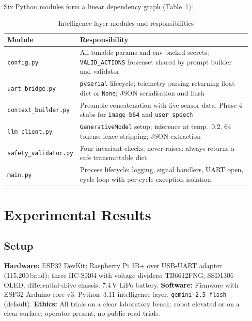 \documentclass[conference]{IEEEtran}
\begin{document}
Six Python modules form a linear dependency graph
(Table~\ref{tab:modules}):

\begin{table}[t]
\caption{Intelligence-layer modules and responsibilities}
\label{tab:modules}
\centering
\renewcommand{\arraystretch}{1.05}
\begin{tabular}{@{}p{2.1cm}p{5.2cm}@{}}
\toprule
\textbf{Module} & \textbf{Responsibility} \\
\midrule
\texttt{config.py}           & All tunable params and env-backed secrets;
  \texttt{VALID\_ACTIONS} frozenset shared by prompt builder and validator \\
\texttt{uart\_bridge.py}     & \texttt{pyserial} lifecycle; telemetry parsing
  returning float dict or \texttt{None}; JSON serialisation and flush \\
\texttt{context\_builder.py} & Preamble concatenation with live sensor data;
  Phase-4 stubs for \texttt{image\_b64} and \texttt{user\_speech} \\
\texttt{llm\_client.py}      & \texttt{GenerativeModel} setup; inference at
  temp.~0.2, 64 tokens; fence stripping; JSON extraction \\
\texttt{safety\_validator.py}& Four invariant checks; never raises; always
  returns a safe transmittable dict \\
\texttt{main.py}             & Process lifecycle: logging, signal handlers,
  UART open, cycle loop with per-cycle exception isolation \\
\bottomrule
\end{tabular}
\end{table}

\section{Experimental Results}
\label{sec:results}

\subsection{Setup}

\textbf{Hardware:} ESP32 DevKit; Raspberry Pi 3B+ over USB-UART adapter
(115,200\,baud); three HC-SR04 with voltage dividers; TB6612FNG;
SSD1306 OLED; differential-drive chassis; 7.4\,V LiPo battery.
\textbf{Software:} Firmware with ESP32 Arduino core v3;
Python~3.11 intelligence layer, \texttt{gemini-2.5-flash} (default).
\textbf{Ethics:} All trials on a clear laboratory bench; robot elevated
or on a clear surface; operator present; no public-road trials.
\end{document}
